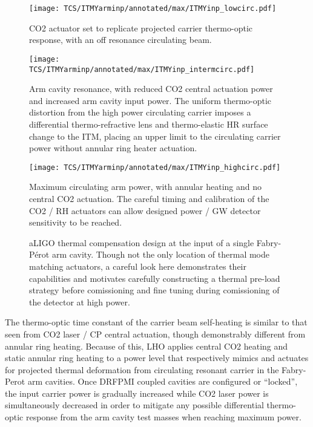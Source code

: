 \begin{figure}[H]
	\begin{subcaptiongroup}
		\centering
		\texttt{[image: TCS/ITMYarminp/annotated/max/ITMYinp\_lowcirc.pdf]}
		\caption{CO2 actuator set to replicate projected carrier thermo-optic response, with an off resonance circulating beam.}\label{subfig:TCSinp_lowcirc}
		\texttt{[image: TCS/ITMYarminp/annotated/max/ITMYinp\_intermcirc.pdf]}
		\caption{Arm cavity resonance, with reduced CO2 central actuation power and increased arm cavity input power. The uniform thermo-optic distortion from the high power circulating carrier imposes a differential thermo-refractive lens and thermo-elastic HR surface change to the ITM, placing an upper limit to the circulating carrier power without annular ring heater actuation.}\label{subfig:TCSinp_intcirc}
		\texttt{[image: TCS/ITMYarminp/annotated/max/ITMYinp\_highcirc.pdf]}
		\caption{Maximum circulating arm power, with annular heating and no central CO2 actuation. The careful timing and calibration of the CO2 / RH actuators can allow designed power / GW detector sensitivity to be reached.}\label{subfig:TCSinp_highcirc}
	\end{subcaptiongroup}
	\caption{aLIGO thermal compensation design at the input of a single Fabry-P\'{e}rot arm cavity. Though not the only location of thermal mode matching actuators, a careful look here demonstrates their capabilities and motivates carefully constructing a thermal pre-load strategy before comissioning and fine tuning during comissioning of the detector at high power.}
	\label{fig:TCSinp}
\end{figure}

The thermo-optic time constant of the carrier beam self-heating is similar to that seen from CO2 laser / CP central actuation, though demonstrably different from annular ring heating. Because of this, LHO applies central CO2 heating and static annular ring heating to a power level that respectively mimics and actuates for projected thermal deformation from circulating resonant carrier in the Fabry-Perot arm cavities. Once DRFPMI coupled cavities are configured or ``locked'', the input carrier power is gradually increased while CO2 laser power is simultaneously decreased in order to mitigate any possible differential thermo-optic response from the arm cavity test masses when reaching maximum power.

